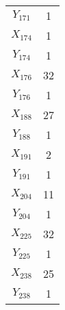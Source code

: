 \documentclass[a4paper,10pt]{article}
\begin{document}
\begin{center}
\begin{longtable}{cc}
$Y_{171}$ & 1 \\
$X_{174}$ & 1 \\
$Y_{174}$ & 1 \\
$X_{176}$ & 32 \\
$Y_{176}$ & 1 \\
$X_{188}$ & 27 \\
$Y_{188}$ & 1 \\
$X_{191}$ & 2 \\
$Y_{191}$ & 1 \\
$X_{204}$ & 11 \\
$Y_{204}$ & 1 \\
$X_{225}$ & 32 \\
$Y_{225}$ & 1 \\
$X_{238}$ & 25 \\
$Y_{238}$ & 1 \\
\end{longtable}
\end{center}
\end{document}

